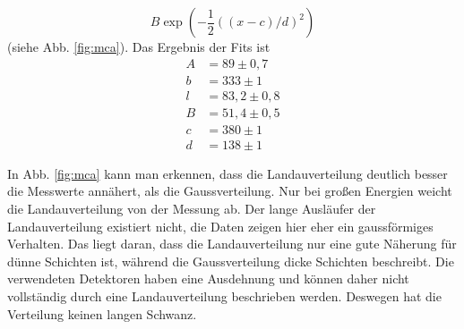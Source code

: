 \[B\exp{\left(-\frac{1}{2}((x-c)/d)^2 \right)}\]
 (siehe Abb. \ref{fig:mca}). Das Ergebnis der Fits ist
 \begin{align}
 A &= 89 \pm 0,7\\
 b &= 333 \pm 1\\
 l &= 83,2  \pm 0,8\\
 B &= 51,4 \pm 0,5\\
 c &= 380 \pm 1\\
 d &= 138 \pm 1
 \end{align}
 
In Abb. \ref{fig:mca} kann man erkennen, dass die Landauverteilung deutlich besser die Messwerte annähert, als die Gaussverteilung. Nur bei großen Energien weicht die Landauverteilung von der Messung ab. Der lange Ausläufer der Landauverteilung existiert nicht, die Daten zeigen hier eher ein gaussförmiges Verhalten. Das liegt daran, dass die Landauverteilung nur eine gute Näherung für dünne Schichten ist, während die Gaussverteilung dicke Schichten beschreibt. Die verwendeten Detektoren haben eine Ausdehnung und können daher nicht vollständig durch eine Landauverteilung beschrieben werden. Deswegen hat die Verteilung keinen langen Schwanz.